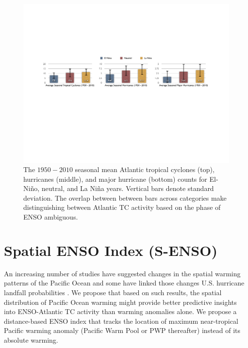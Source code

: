 \documentclass[]{article}
\begin{document}

\begin{figure}[htbp]
	\hspace*{-.5cm}
	\centering
		\includegraphics[width=5in]{figures/nino_nina_avg_diff.pdf}
	\caption{The $1950-2010$ seasonal mean Atlantic tropical cyclones (top), hurricanes (middle), and major hurricane (bottom) counts for El-Ni\~no, neutral, and La Ni\~na years. Vertical bars denote standard deviation. The overlap between between bars across categories make distinguishing between Atlantic TC activity based on the phase of ENSO ambiguous.}
	\label{fig:enso_bars}
\end{figure}




\section{Spatial ENSO Index (S-ENSO)}
An increasing number of studies have suggested changes in the spatial warming patterns of the Pacific Ocean and some have linked those changes U.S. hurricane landfall probabilities \cite{kim2009}. We propose that based on such results, the spatial distribution of Pacific Ocean warming might provide better predictive insights into ENSO-Atlantic TC activity than warming anomalies alone. We propose a distance-based ENSO index that tracks the location of maximum near-tropical Pacific warming anomaly (Pacific Warm Pool or PWP thereafter) instead of its absolute warming.
\end{document}
